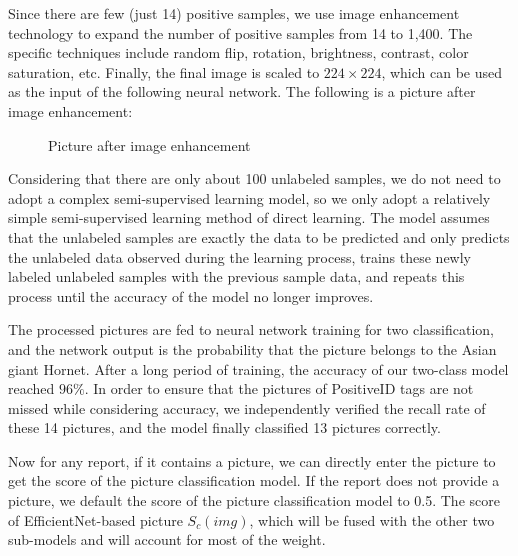 \documentclass{mcmthesis}
\numberwithin{figure}{section}
\numberwithin{table}{section}
\begin{document}
Since there are few (just 14) positive samples, we use image enhancement technology to expand the number of positive samples from 14 to 1,400. The specific techniques include random flip, rotation, brightness, contrast, color saturation, etc. Finally, the final image is scaled to $224 \times 224$, which can be used as the input of the following neural network. The following is a picture after image enhancement:

\begin{figure}[H]
  \caption{Picture after image enhancement}\label{sohfwaf}
\end{figure}

Considering that there are only about 100 unlabeled samples, we do not need to adopt a complex semi-supervised learning model, so we only adopt a relatively simple semi-supervised learning method of direct learning. The model assumes that the unlabeled samples are exactly the data to be predicted and only predicts the unlabeled data observed during the learning process, trains these newly labeled unlabeled samples with the previous sample data, and repeats this process until the accuracy of the model no longer improves.


The processed pictures are fed to neural network training for two classification, and the network output is the probability that the picture belongs to the Asian giant Hornet. After a long period of training, the accuracy of our two-class model reached $96\%$. In order to ensure that the pictures of PositiveID tags are not missed while considering accuracy, we independently verified the recall rate of these 14 pictures, and the model finally classified 13 pictures correctly.

Now for any report, if it contains a picture, we can directly enter the picture to get the score of the picture classification model. If the report does not provide a picture, we default the score of the picture classification model to 0.5. The score of EfficientNet-based picture $S_c(img)$, which will be fused with the other two sub-models and will account for most of the weight.
\end{document}
